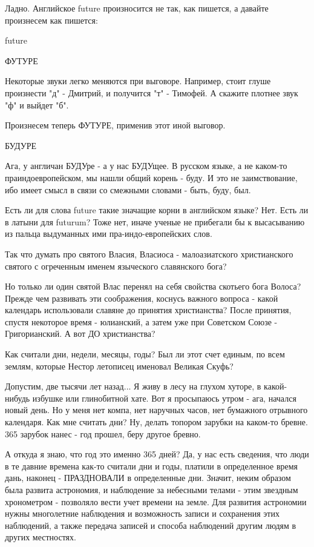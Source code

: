 \documentclass[a5paper,11pt,openany]{article}
\begin{document}
   Ладно. Английское future произносится не так, как пишется, а давайте произнесем как пишется:

future

   ФУТУРЕ

   Некоторые звуки легко меняются при выговоре. Например, стоит глуше произнести "д" - Дмитрий, и получится "т" - Тимофей. А скажите плотнее звук "ф" и выйдет "б".

   Произнесем теперь ФУТУРЕ, применив этот иной выговор.

   БУДУРЕ

   Ага, у англичан БУДУре - а у нас БУДУщее. В русском языке, а не каком-то праиндоевропейском, мы нашли общий корень - буду. И это не заимствование, ибо имеет смысл в связи со смежными словами - быть, буду, был.

   Есть ли для слова future такие значащие корни в английском языке? Нет. Есть ли в латыни для futurum? Тоже нет, иначе ученые не прибегали бы к высасыванию из пальца выдуманных ими пра-индо-европейских слов.

   Так что думать про святого Власия, Власиоса - малоазиатского христианского святого с огреченным именем языческого славянского бога? 

    Но только ли один святой Влас перенял на себя свойства скотьего бога Волоса? Прежде чем развивать эти соображения, коснусь важного вопроса - какой календарь использовали славяне до принятия христианства? После принятия, спустя некоторое время - юлианский, а затем уже при Советском Союзе - Григорианский. А вот ДО христианства? 

   Как считали дни, недели, месяцы, годы? Был ли этот счет единым, по всем землям, которые Нестор летописец именовал Великая Скуфь? 

   Допустим, две тысячи лет назад... Я живу в лесу на глухом хуторе, в какой-нибудь избушке или глинобитной хате. Вот я просыпаюсь утром - ага, начался новый день. Но у меня нет компа, нет наручных часов, нет бумажного отрывного календаря. Как мне считать дни? Ну, делать топором зарубки на каком-то бревне. 365 зарубок нанес - год прошел, беру другое бревно.

   А откуда я знаю, что год это именно 365 дней? Да, у нас есть сведения, что люди в те давние времена как-то считали дни и годы, платили в определенное время дань, наконец - ПРАЗДНОВАЛИ в определенные дни. Значит, неким образом была развита астрономия, и наблюдение за небесными телами - этим звездным хронометром - позволяло вести учет времени на земле. Для развития астрономии нужны многолетние наблюдения и возможность записи и сохранения этих наблюдений, а также передача записей и способа наблюдений другим людям в других местностях.
\end{document}
